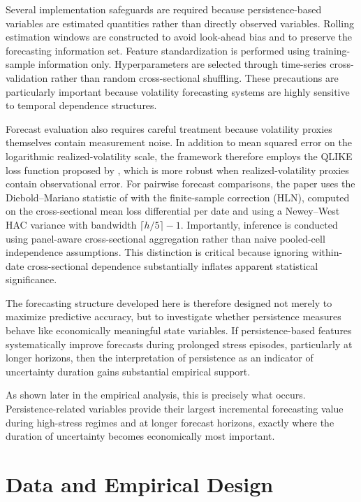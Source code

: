 \documentclass[unnumsec,webpdf,contemporary,large]{oup-authoring-template}%
\theoremstyle{thmstyleone}%
\theoremstyle{thmstyletwo}%
\theoremstyle{thmstylethree}%
\begin{document}
Several implementation safeguards are required because persistence-based
variables are estimated quantities rather than directly observed variables.
Rolling estimation windows are constructed to avoid look-ahead bias and to
preserve the forecasting information set. Feature standardization is
performed using training-sample information only. Hyperparameters are
selected through time-series cross-validation rather than random
cross-sectional shuffling. These precautions are particularly important
because volatility forecasting systems are highly sensitive to temporal
dependence structures.

Forecast evaluation also requires careful treatment because volatility
proxies themselves contain measurement noise. In addition to mean squared
error on the logarithmic realized-volatility scale, the framework therefore
employs the QLIKE loss function proposed by \citet{patton2011volatility},
which is more robust when realized-volatility proxies contain observational
error. For pairwise forecast comparisons, the paper uses the
Diebold--Mariano statistic of \citet{diebold1995comparing} with the
\citet{harvey1997testing} finite-sample correction (HLN), computed on the
cross-sectional mean loss differential per date and using a Newey--West HAC
variance with bandwidth $\lceil h/5\rceil-1$. Importantly, inference is
conducted using panel-aware cross-sectional aggregation rather than naive
pooled-cell independence assumptions. This distinction is critical because
ignoring within-date cross-sectional dependence substantially inflates
apparent statistical significance.

The forecasting structure developed here is therefore designed not merely
to maximize predictive accuracy, but to investigate whether persistence
measures behave like economically meaningful state variables. If
persistence-based features systematically improve forecasts during prolonged
stress episodes, particularly at longer horizons, then the interpretation
of persistence as an indicator of uncertainty duration gains substantial
empirical support.

As shown later in the empirical analysis, this is precisely what occurs.
Persistence-related variables provide their largest incremental forecasting
value during high-stress regimes and at longer forecast horizons, exactly
where the duration of uncertainty becomes economically most important.

\section{Data and Empirical Design}
\label{sec:data}
\end{document}
